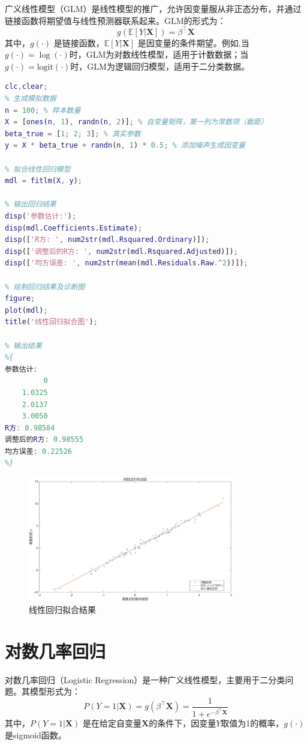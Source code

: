 广义线性模型（GLM）是线性模型的推广，允许因变量服从非正态分布，并通过链接函数将期望值与线性预测器联系起来。GLM的形式为：
\begin{equation}
    g(\mathbb{E}[Y|\mathbf{X}]) = \beta^\top \mathbf{X}
\end{equation}
其中，$g(\cdot)$ 是链接函数，$\mathbb{E}[Y|\mathbf{X}]$ 是因变量的条件期望。例如,当$g(\cdot)=\log(\cdot)$时，GLM为对数线性模型，适用于计数数据；当$g(\cdot)=\text{logit}(\cdot)$时，GLM为逻辑回归模型，适用于二分类数据。
\begin{lstlisting}[language=Matlab, caption=线性回归的Matlab代码,label=lst:linear_regression]
% 线性回归的Matlab代码示例
clc,clear;
% 生成模拟数据
n = 100; % 样本数量
X = [ones(n, 1), randn(n, 2)]; % 自变量矩阵，第一列为常数项（截距）
beta_true = [1; 2; 3]; % 真实参数
y = X * beta_true + randn(n, 1) * 0.5; % 添加噪声生成因变量

% 拟合线性回归模型
mdl = fitlm(X, y);

% 输出回归结果
disp('参数估计:');
disp(mdl.Coefficients.Estimate);
disp(['R方: ', num2str(mdl.Rsquared.Ordinary)]);
disp(['调整后的R方: ', num2str(mdl.Rsquared.Adjusted)]);
disp(['均方误差: ', num2str(mean(mdl.Residuals.Raw.^2))]);

% 绘制回归结果及诊断图
figure;
plot(mdl);
title('线性回归拟合图');

% 输出结果
%{
参数估计:
         0
    1.0325
    2.0137
    3.0050
R方: 0.98584
调整后的R方: 0.98555
均方误差: 0.22526
%}
\end{lstlisting}
\begin{figure}[H]
    \centering
    \includegraphics[width=0.8\textwidth]{./static/images/线性回归图.png}
    \caption{线性回归拟合结果}
    \label{fig:linear_regression_fit}
\end{figure}
\section{对数几率回归}
对数几率回归（Logistic Regression）是一种广义线性模型，主要用于二分类问题。其模型形式为：
\begin{equation}
    P(Y=1|\mathbf{X}) = g(\beta^\top \mathbf{X}) = \frac{1}{1 + e^{-\beta^\top \mathbf{X}}}
\end{equation}
其中，$P(Y=1|\mathbf{X})$ 是在给定自变量$\mathbf{X}$的条件下，因变量$Y$取值为1的概率，$g(\cdot)$ 是sigmoid函数。
